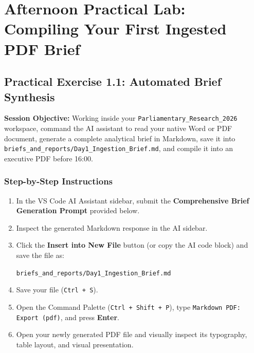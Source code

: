 \documentclass[11pt, a4paper]{report}
\begin{document}
\chapter{Afternoon Practical Lab: Compiling Your First Ingested PDF Brief}

\section{Practical Exercise 1.1: Automated Brief Synthesis}
\textbf{Session Objective:} Working inside your \texttt{Parliamentary\_Research\_2026} workspace, command the AI assistant to read your native Word or PDF document, generate a complete analytical brief in Markdown, save it into \texttt{briefs\_and\_reports/Day1\_Ingestion\_Brief.md}, and compile it into an executive PDF before 16:00.

\subsection{Step-by-Step Instructions}
\begin{enumerate}[label=\textbf{Step \arabic*:}]
    \item In the VS Code AI Assistant sidebar, submit the \textcolor{suagreen}{\textbf{Comprehensive Brief Generation Prompt}} provided below.
    \item Inspect the generated Markdown response in the AI sidebar.
    \item Click the \textbf{Insert into New File} button (or copy the AI code block) and save the file as:
    \begin{center}
        \texttt{briefs\_and\_reports/Day1\_Ingestion\_Brief.md}
    \end{center}
    \item Save your file (\texttt{Ctrl + S}).
    \item Open the Command Palette (\texttt{Ctrl + Shift + P}), type \texttt{Markdown PDF: Export (pdf)}, and press \textbf{Enter}.
    \item Open your newly generated PDF file and visually inspect its typography, table layout, and visual presentation.
\end{enumerate}
\end{document}
